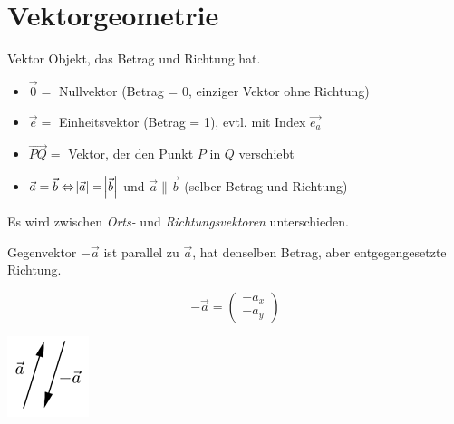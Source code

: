 \graphicspath{{images/}}

\section{Vektorgeometrie}

\begin{definition}{Vektor}
    Objekt, das Betrag und Richtung hat.
    \begin{itemize}
        \item $\overrightarrow{0} = $ Nullvektor (Betrag = 0, einziger Vektor ohne Richtung)
        \item $\overrightarrow{e} = $ Einheitsvektor (Betrag = 1), evtl. mit Index $\vec{e_a}$
        \item $\vec{PQ}=$ Vektor, der den Punkt $P$ in $Q$ verschiebt
        \item $\vec{a} = \vec{b} \Leftrightarrow \abs{\vec{a}} = \abs{\vec{b}}$ und $\vec{a} \parallel \vec{b}$ (selber Betrag und Richtung)
    \end{itemize}
    Es wird zwischen \textit{Orts-} und \textit{Richtungsvektoren} unterschieden.
\end{definition}

\begin{minipage}{0.6\linewidth}
    \begin{definition}{Gegenvektor}
        $-\vec{a}$ ist parallel zu $\vec{a}$, hat denselben Betrag,
        aber entgegengesetzte Richtung. 
    \end{definition}
    \end{minipage}
    \begin{minipage}{0.25\linewidth}
        {\small
        $$-\overrightarrow{a} = \begin{pmatrix}
            -a_x \\
            -a_y
            \end{pmatrix}$$}
    \end{minipage}
    \begin{minipage}{0.13\linewidth}
        \includegraphics[width=0.8\linewidth]{vec-gegen.png}
    \end{minipage}

